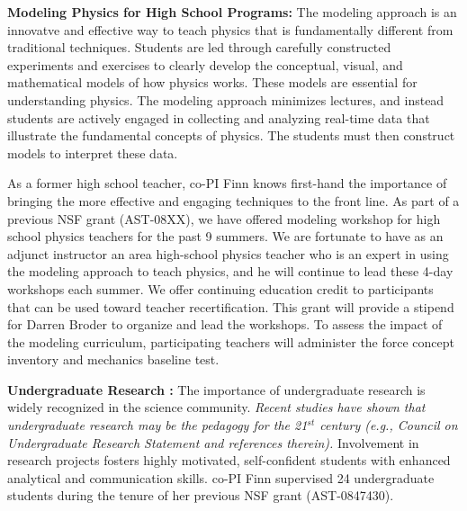 \documentclass[11pt, preprint]{aastex}
\begin{document}
{{\bf Modeling Physics for High School Programs:  }
The modeling
approach is an innovatve and effective way to teach physics that is 
fundamentally different from traditional techniques.  Students are led through
carefully constructed experiments and exercises to clearly develop the conceptual, 
visual, and mathematical models of how physics works.  
These models are essential for understanding physics.
The modeling approach minimizes lectures, and instead 
students are actively engaged in collecting and analyzing real-time data
that illustrate the fundamental concepts of physics.   The students must
then construct models to interpret these
data.  

As a former high school teacher, co-PI Finn knows first-hand the importance of 
bringing the more effective and engaging techniques to the front line.
As part of a previous NSF grant (AST-08XX), we have offered 
modeling workshop for high school physics teachers for the past 9 summers.
We are fortunate
to have as an adjunct instructor an area high-school physics teacher who
is an expert in using the modeling approach to teach physics, and
he will continue to lead these 4-day workshops each summer.  
We offer continuing education credit to participants 
that can be used toward teacher recertification.
This grant will provide a stipend for Darren Broder to organize and lead
the workshops.  
To assess the impact of the modeling curriculum, participating teachers
will administer the force concept inventory and mechanics baseline test.


{\bf Undergraduate Research  :}
The importance of undergraduate research is widely recognized
in the science community.
{\em Recent studies have shown that undergraduate research may be the
pedagogy for the 21$^{st}$ century (e.g., Council on Undergraduate Research
Statement and references therein).}
Involvement in research projects
fosters highly motivated, self-confident students with enhanced
analytical and communication skills. 
co-PI Finn supervised 24 undergraduate students during the tenure of her
previous NSF grant (AST-0847430).

}
\end{document}
